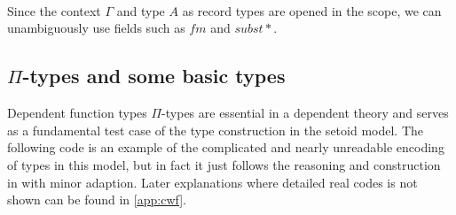 \begin{code}
\\
\>[0]\<[17]%
\>[17]   \AgdaInductiveConstructor{,} \<[29]%
\>[29]\<%
\\
\>[0]\<[17]%
\>[17]\AgdaFunction{[}  \AgdaSymbol{\_} \AgdaFunction{]trans} \AgdaSymbol{(}\AgdaFunction{[}  \AgdaSymbol{\_} \AgdaFunction{]trans} \AgdaSymbol{(}\AgdaFunction{[}  \AgdaSymbol{\_} \AgdaFunction{]sym} \AgdaSymbol{(} \AgdaSymbol{\_))}\<%
\\
\>[0]\<[17]%
\>[17]\AgdaSymbol{(} \AgdaSymbol{\_} \AgdaSymbol{))}  \AgdaSymbol{\}}\<%
\\
\>[0]\<[7]%
\>[7]\AgdaSymbol{\}}\<%
\\
\>[0]\<[7]%
\>[7] \<[13]%
\>[13]\<%
\\
\>[7]\<[9]%
\>[9]  \<%
\\
\>[7]\<[9]%
\>[9]   \<[23]%
\>[23]\<%
\\
\end{code}

Since the context $\Gamma$ and type $A$ as record types are opened in the scope, we can unambiguously use fields such as $fm$ and $subst*$.

\subsection{$\Pi$-types and some basic types}

Dependent function types $\Pi$-types are essential in a dependent theory and serves as a fundamental test case of the type construction in the setoid model. 
The following code is an example of the complicated and nearly unreadable encoding of types in this model, but in fact it just follows the reasoning and construction in \cite{alti:lics99} with minor adaption. Later explanations where detailed real codes is not shown can be found in \autoref{app:cwf}.

